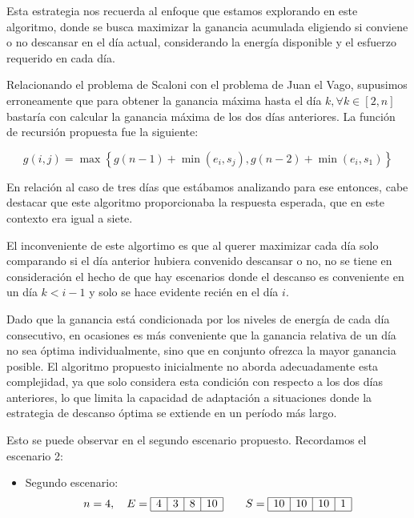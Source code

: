 Esta estrategia nos recuerda al enfoque que estamos explorando en este algoritmo, donde se busca maximizar
la ganancia acumulada eligiendo si conviene o no descansar en el día actual, considerando la energía disponible
y el esfuerzo requerido en cada día.

Relacionando el problema de Scaloni con el problema de Juan el Vago, supusimos erroneamente que para obtener la
ganancia máxima hasta el día $k, \forall k \in [2,n]$ bastaría con calcular la ganancia máxima de los dos días anteriores.
La función de recursión propuesta fue la siguiente:  

$$g(i, j) = \max{\left\{g(n-1) + \min{(e_i,s_j)}, g(n-2) + \min{(e_i,s_1)}\right\}}$$

En relación al caso de tres días que estábamos analizando para ese entonces, cabe destacar que este algoritmo proporcionaba la respuesta esperada, 
que en este contexto era igual a siete.

El inconveniente de este algortimo es que al querer maximizar cada día solo comparando si el día anterior hubiera convenido
descansar o no, no se tiene en consideración el hecho de que hay escenarios donde el descanso es conveniente en un día
$k < i-1$ y solo se hace evidente recién en el día $i$. 

Dado que la ganancia está condicionada por los niveles de energía de cada día consecutivo, en ocasiones es más 
conveniente que la ganancia relativa de un día no sea óptima individualmente, sino que en conjunto 
ofrezca la mayor ganancia posible. El algoritmo propuesto inicialmente no aborda adecuadamente esta complejidad, 
ya que solo considera esta condición con respecto a los dos días anteriores, lo que limita la 
capacidad de adaptación a situaciones donde la estrategia de descanso óptima se extiende en un 
período más largo.

Esto se puede observar en el segundo escenario propuesto. 
Recordamos el escenario 2:
\begin{itemize}
    \item Segundo escenario:
    $$
    n = 4,\quad
    E=
    \begin{array}{|c|c|c|c|}
        \hline 
        4 & 3 & 8 & 10\\
        \hline 
    \end{array}
    \qquad
    S=
    \begin{array}{|c|c|c|c|}
        \hline 
        10 & 10 & 10 & 1\\
        \hline 
    \end{array}
    $$
\end{itemize}


